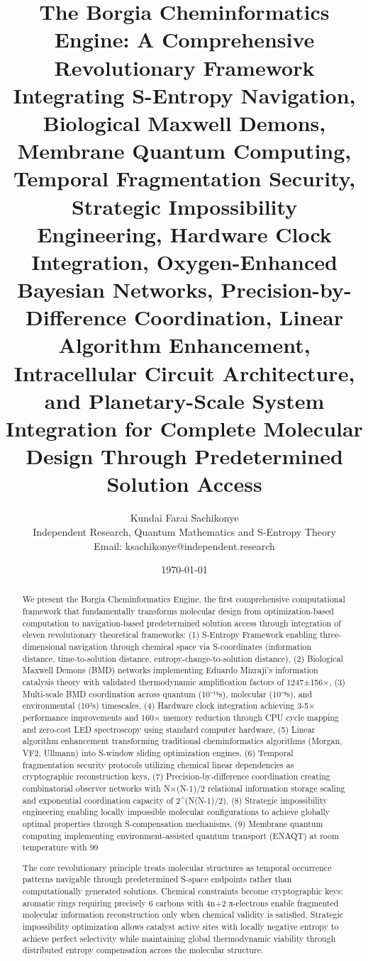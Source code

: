 \documentclass[11pt,a4paper]{article}
\title{The Borgia Cheminformatics Engine: A Comprehensive Revolutionary Framework Integrating S-Entropy Navigation, Biological Maxwell Demons, Membrane Quantum Computing, Temporal Fragmentation Security, Strategic Impossibility Engineering, Hardware Clock Integration, Oxygen-Enhanced Bayesian Networks, Precision-by-Difference Coordination, Linear Algorithm Enhancement, Intracellular Circuit Architecture, and Planetary-Scale System Integration for Complete Molecular Design Through Predetermined Solution Access}
\author{Kundai Farai Sachikonye\\
Independent Research, Quantum Mathematics and S-Entropy Theory\\
Email: ksachikonye@independent.research}
\date{\today}
\begin{document}
\maketitle

\begin{abstract}

We present the Borgia Cheminformatics Engine, the first comprehensive computational framework that fundamentally transforms molecular design from optimization-based computation to navigation-based predetermined solution access through integration of eleven revolutionary theoretical frameworks: (1) S-Entropy Framework enabling three-dimensional navigation through chemical space via S-coordinates (information distance, time-to-solution distance, entropy-change-to-solution distance), (2) Biological Maxwell Demons (BMD) networks implementing Eduardo Mizraji's information catalysis theory with validated thermodynamic amplification factors of 1247±156×, (3) Multi-scale BMD coordination across quantum (10⁻¹⁵s), molecular (10⁻⁹s), and environmental (10²s) timescales, (4) Hardware clock integration achieving 3-5× performance improvements and 160× memory reduction through CPU cycle mapping and zero-cost LED spectroscopy using standard computer hardware, (5) Linear algorithm enhancement transforming traditional cheminformatics algorithms (Morgan, VF2, Ullmann) into S-window sliding optimization engines, (6) Temporal fragmentation security protocols utilizing chemical linear dependencies as cryptographic reconstruction keys, (7) Precision-by-difference coordination creating combinatorial observer networks with N×(N-1)/2 relational information storage scaling and exponential coordination capacity of 2^(N(N-1)/2), (8) Strategic impossibility engineering enabling locally impossible molecular configurations to achieve globally optimal properties through S-compensation mechanisms, (9) Membrane quantum computing implementing environment-assisted quantum transport (ENAQT) at room temperature with 99%

The core revolutionary principle treats molecular structures as temporal occurrence patterns navigable through predetermined S-space endpoints rather than computationally generated solutions. Chemical constraints become cryptographic keys: aromatic rings requiring precisely 6 carbons with 4n+2 π-electrons enable fragmented molecular information reconstruction only when chemical validity is satisfied. Strategic impossibility optimization allows catalyst active sites with locally negative entropy to achieve perfect selectivity while maintaining global thermodynamic viability through distributed entropy compensation across the molecular structure.


\end{abstract}
\end{document}
